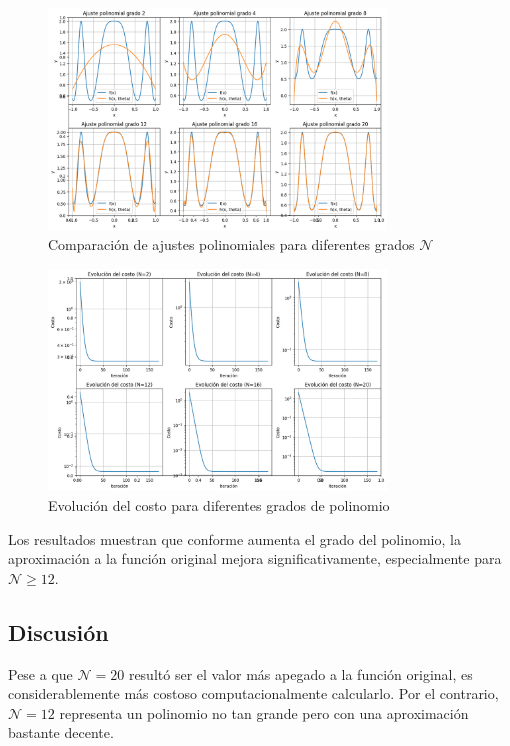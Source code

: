 \documentclass{article}
\begin{document}
\begin{figure}[H]
    \centering
    \includegraphics[width=0.8\textwidth]{images/2_comparasion_Ns.png}
    \caption{Comparación de ajustes polinomiales para diferentes grados $\mathcal{N}$}
    \label{fig:comparison_N}
\end{figure}

\begin{figure}[H]
    \centering
    \includegraphics[width=0.8\textwidth]{images/2_comparasion_Ns_costs.png}
    \caption{Evolución del costo para diferentes grados de polinomio}
    \label{fig:comparison_costs}
\end{figure}

Los resultados muestran que conforme aumenta el grado del polinomio, la aproximación a la función original mejora significativamente, especialmente para $\mathcal{N} \geq 12$.

\subsection{Discusión}

Pese a que $\mathcal{N} = 20$ resultó ser el valor más apegado a la función original, es considerablemente más costoso computacionalmente calcularlo. Por el contrario, $\mathcal{N} = 12$ representa un polinomio no tan grande pero con una aproximación bastante decente.
\end{document}
